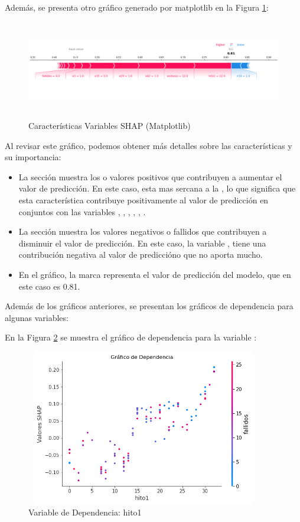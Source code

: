 Además, se presenta otro gráfico generado por matplotlib en la Figura \ref{fig:caract_var_shap_mat}:

\begin{figure}[H]
    \centering
    \includegraphics[width=6.0611in,height=1.6861in]{img/shap_rf/shapForcePlot.png}
    \caption{Características Variables SHAP (Matplotlib)}
    \label{fig:caract_var_shap_mat}
\end{figure}

Al revisar este gráfico, podemos obtener más detalles sobre las características y su importancia:

\begin{itemize}
    \item La sección  muestra los  o valores positivos que contribuyen a aumentar el valor de predicción. En este caso,  esta mas sercana a la , lo que significa que esta característica contribuye positivamente al valor de predicción en conjuntos con las variables , , , , , .
    \item La sección  muestra los valores negativos o fallidos que contribuyen a disminuir el valor de predicción. En este caso, la variable , tiene una contribución negativa al valor de prediccióno que no aporta mucho.
    \item En el gráfico, la marca  representa el valor de predicción del modelo, que en este caso es 0.81.
\end{itemize}

Además de los gráficos anteriores, se presentan los gráficos de dependencia para algunas variables:

En la Figura \ref{fig:dependencia_hito1} se muestra el gráfico de dependencia para la variable :

\begin{figure}[H]
    \centering
    \includegraphics[width=4.0611in,height=2.6861in]{img/shap_rf/hito1.png}
    \caption{Variable de Dependencia: hito1}
    \label{fig:dependencia_hito1}
\end{figure}

